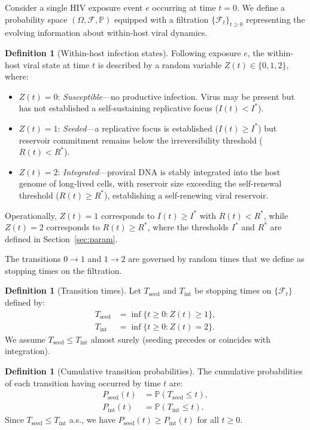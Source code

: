 \documentclass[12pt,a4paper]{article}
\theoremstyle{plain}
\theoremstyle{definition}
\newtheorem{definition}[theorem]{Definition}
\theoremstyle{remark}
\newcommand{\Pint}{P_{\mathrm{int}}}
\newcommand{\Pseed}{P_{\mathrm{seed}}}
\newcommand{\Prob}{\mathbb{P}}
\begin{document}
Consider a single HIV exposure event $e$ occurring at time $t=0$. We define a probability space $(\Omega, \mathcal{F}, \Prob)$ equipped with a filtration $\{\mathcal{F}_t\}_{t \geq 0}$ representing the evolving information about within-host viral dynamics.

\begin{definition}[Within-host infection states]\label{def:states}
Following exposure $e$, the within-host viral state at time $t$ is described by a random variable $Z(t) \in \{0, 1, 2\}$, where:
\begin{itemize}
    \item $Z(t) = 0$: \emph{Susceptible}---no productive infection. Virus may be present but has not established a self-sustaining replicative focus ($I(t) < I^*$).
    \item $Z(t) = 1$: \emph{Seeded}---a replicative focus is established ($I(t) \geq I^*$) but reservoir commitment remains below the irreversibility threshold ($R(t) < R^*$).
    \item $Z(t) = 2$: \emph{Integrated}---proviral DNA is stably integrated into the host genome of long-lived cells, with reservoir size exceeding the self-renewal threshold ($R(t) \geq R^*$), establishing a self-renewing viral reservoir.
\end{itemize}
Operationally, $Z(t) = 1$ corresponds to $I(t) \geq I^*$ with $R(t) < R^*$, while $Z(t) = 2$ corresponds to $R(t) \geq R^*$, where the thresholds $I^*$ and $R^*$ are defined in Section~\ref{sec:param}.
\end{definition}

The transitions $0 \to 1$ and $1 \to 2$ are governed by random times that we define as stopping times on the filtration.

\begin{definition}[Transition times]\label{def:stopping-times}
Let $T_{\mathrm{seed}}$ and $T_{\mathrm{int}}$ be stopping times on $\{\mathcal{F}_t\}$ defined by:
\begin{align}
    T_{\mathrm{seed}} &= \inf\{t \geq 0 : Z(t) \geq 1\}, \\
    T_{\mathrm{int}} &= \inf\{t \geq 0 : Z(t) = 2\}.
\end{align}
We assume $T_{\mathrm{seed}} \leq T_{\mathrm{int}}$ almost surely (seeding precedes or coincides with integration).
\end{definition}

\begin{definition}[Cumulative transition probabilities]\label{def:cum-prob}
The cumulative probabilities of each transition having occurred by time $t$ are:
\begin{align}
    \Pseed(t) &= \Prob(T_{\mathrm{seed}} \leq t), \label{eq:Pseed}\\
    \Pint(t) &= \Prob(T_{\mathrm{int}} \leq t). \label{eq:Pint}
\end{align}
Since $T_{\mathrm{seed}} \leq T_{\mathrm{int}}$ a.s., we have $\Pseed(t) \geq \Pint(t)$ for all $t \geq 0$.
\end{definition}
\end{document}

